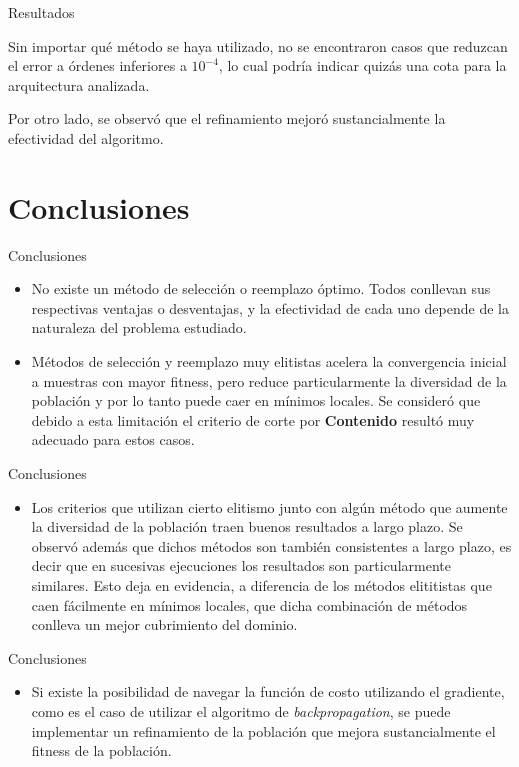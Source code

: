 \documentclass{beamer}
\begin{document}
\begin{frame}{Resultados}

\par Sin importar qué método se haya utilizado, no se encontraron casos que reduzcan el error a órdenes inferiores a $10^{-4}$, lo cual podría indicar quizás una cota para la arquitectura analizada.\\
\vspace{5px}
\par Por otro lado, se observó que el refinamiento mejoró sustancialmente la efectividad del algoritmo.
\end{frame}


\section{Conclusiones}
\begin{frame}{Conclusiones}
\begin{itemize}
\item No existe un método de selección o reemplazo óptimo. Todos conllevan sus respectivas ventajas o 
desventajas, y la efectividad de cada uno depende de la naturaleza del problema estudiado.
\item Métodos de selección y reemplazo muy elitistas acelera la convergencia inicial a muestras 
con mayor fitness, pero reduce particularmente la diversidad de la población y por lo tanto puede 
caer en mínimos locales. Se consideró que debido a esta limitación el criterio de corte por \textbf{Contenido} resultó muy adecuado para estos casos.
\end{itemize}
\end{frame}

\begin{frame}{Conclusiones}
\begin{itemize}
\item Los criterios que utilizan cierto elitismo junto con algún método que aumente la diversidad de la población traen buenos resultados a largo plazo. Se observó además que dichos métodos son también consistentes a largo plazo, es decir que en sucesivas ejecuciones los resultados son particularmente similares. Esto deja en evidencia, a diferencia de los métodos elititistas que caen fácilmente en mínimos locales, que dicha combinación de métodos conlleva un mejor cubrimiento del dominio.
\end{itemize}
\end{frame}

\begin{frame}{Conclusiones}
\begin{itemize}
\item Si existe la posibilidad de navegar la función de costo utilizando el gradiente, como es el caso de utilizar el algoritmo de \textit{backpropagation}, se puede implementar un refinamiento de la población que mejora sustancialmente el fitness de la población.
\end{itemize}
\end{frame}
\end{document}

